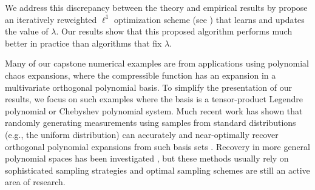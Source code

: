 We address this discrepancy between the theory and empirical results by propose an iteratively reweighted $\ell^1$ optimization scheme (see \cite{CandesWakinBoydReweighted}) that learns and updates the value of $\lambda$. Our results show that this proposed algorithm performs much better in practice than algorithms that fix $\lambda$. 

Many of our capstone numerical examples are from applications using polynomial chaos expansions, where the compressible function has an expansion in a multivariate orthogonal polynomial basis. To simplify the presentation of our results, we focus on such examples where the basis is a tensor-product Legendre polynomial or Chebyshev polynomial system. Much recent work has shown that randomly generating measurements using samples from standard distributions (e.g., the uniform distribution) can accurately and near-optimally recover orthogonal polynomial expansions from such basis sets \cite{Rauhut,JakemanEtAl_l1Enhance,YanGuoXui_l1UQ}. Recovery in more general polynomial spaces has been investigated \cite{HamptonDoostanCSPCE,jakeman_generalized_2016,GuoEtAlRandomizedQuad}, but these methods usually rely on sophisticated sampling strategies and optimal sampling schemes are still an active area of research.
